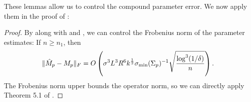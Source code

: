 These lemmas allow us to control the compound parameter error.
We now apply them in the proof of :
\begin{proof}
By  along with  and ,
we can control the Frobenius norm of the parameter estimates:
If $n \ge n_1$, then
\begin{align}
  \|\hat M_p - M_p\|_F = O\left( \sigma^3 L^3 R^6 k^{\frac12} \sigma_\text{\rm min}(\Sigma_p)^{-1} \sqrt{\frac{\log^3 (1/\delta)}{n}} \right).
\end{align}
The Frobenius norm upper bounds the operator norm,
so we can directly apply Theorem 5.1 of \citet{AnandkumarGeHsu2012}.
\end{proof}

